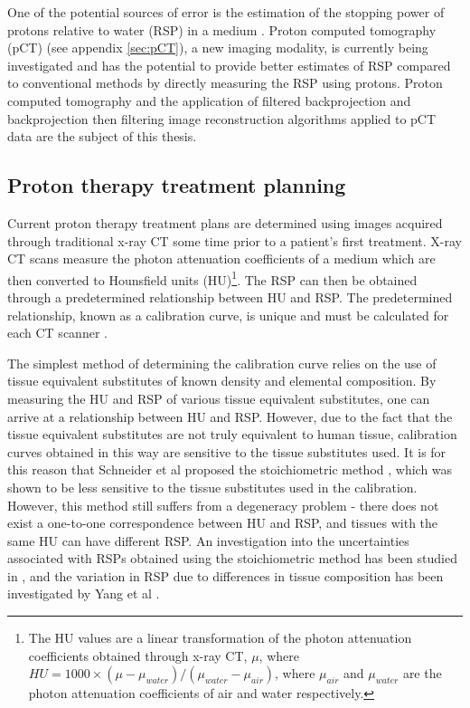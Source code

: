 \documentclass[11pt,a4paper]{article}
\begin{document}
One of the potential sources of error is the estimation of the stopping power of protons relative to water (RSP) in a medium \cite{yang2012comprehensive}. Proton computed tomography (pCT) (see appendix \ref{sec:pCT}), a new imaging modality, is currently being investigated and has the potential to provide better estimates of RSP compared to conventional methods by directly measuring the RSP using protons. Proton computed tomography and the application of filtered backprojection and backprojection then filtering image reconstruction algorithms applied to pCT data are the subject of this thesis.




\subsection{Proton therapy treatment planning}

Current proton therapy treatment plans are determined using images acquired through traditional x-ray CT some time prior to a patient's first treatment. X-ray CT scans measure the photon attenuation coefficients of a medium which are then converted to Hounsfield units (HU)\footnote{The HU values are a linear transformation of the photon attenuation coefficients obtained through x-ray CT, $\mu$, where $HU = 1000 \times (\mu - \mu_{water})/(\mu_{water} - \mu_{air})$, where $\mu_{air}$ and $\mu_{water}$ are the photon attenuation coefficients of air and water respectively.}. The RSP can then be obtained through a predetermined relationship between HU and RSP. The predetermined relationship, known as a calibration curve, is unique and must be calculated for each CT scanner \cite{constantinou1992electron}. 

The simplest method of determining the calibration curve relies on the use of tissue equivalent substitutes of known density and elemental composition. By measuring the HU and RSP of various tissue equivalent substitutes, one can arrive at a relationship between HU and RSP. However, due to the fact that the tissue equivalent substitutes are not truly equivalent to human tissue, calibration curves obtained in this way are sensitive to the tissue substitutes used. It is for this reason that Schneider et al proposed the stoichiometric method \cite{schneider1996calibration}, which was shown to be less sensitive to the tissue substitutes used in the calibration. However, this method still suffers from a degeneracy problem - there does not exist a one-to-one correspondence between HU and RSP, and tissues with the same HU can have different RSP. An investigation into the uncertainties associated with RSPs obtained using the stoichiometric method has been studied in \cite{yang2012comprehensive}, and the variation in RSP due to differences in tissue composition has been investigated by Yang et al \cite{yang2010theoretical}. 
\end{document}
